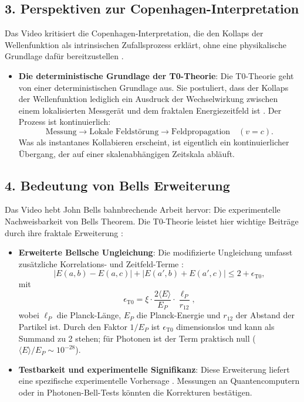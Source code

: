 	\subsection*{3. Perspektiven zur Copenhagen-Interpretation}
	
	Das Video kritisiert die Copenhagen-Interpretation, die den Kollaps der Wellenfunktion als intrinsischen Zufallsprozess erklärt, ohne eine physikalische Grundlage dafür bereitzustellen \cite{VideoBell2024}.
	
	\begin{itemize}
		\item \textbf{Die deterministische Grundlage der T0-Theorie}: Die T0-Theorie geht von einer deterministischen Grundlage aus. Sie postuliert, dass der Kollaps der Wellenfunktion lediglich ein Ausdruck der Wechselwirkung zwischen einem lokalisierten Messgerät und dem fraktalen Energiezeitfeld ist . Der Prozess ist kontinuierlich:
		\[
		\text{Messung} \rightarrow \text{Lokale Feldstörung} \rightarrow \text{Feldpropagation} \quad (v = c).
		\]
		Was als instantanes Kollabieren erscheint, ist eigentlich ein kontinuierlicher Übergang, der auf einer skalenabhängigen Zeitskala abläuft.
	\end{itemize}
	
	\subsection*{4. Bedeutung von Bells Erweiterung}
	
	Das Video hebt John Bells bahnbrechende Arbeit hervor: Die experimentelle Nachweisbarkeit von Bells Theorem. Die T0-Theorie leistet hier wichtige Beiträge durch ihre fraktale Erweiterung \cite{DynMassePhotonenNichtlokalEn, NoGoEn}:
	
	\begin{itemize}
		\item \textbf{Erweiterte Bellsche Ungleichung}: Die modifizierte Ungleichung umfasst zusätzliche Korrelations- und Zeitfeld-Terme \cite{DynMassePhotonenNichtlokalEn}:
		\[
		|E(a,b) - E(a,c)| + |E(a',b) + E(a',c)| \leq 2 + \epsilon_{\mathrm{T0}},
		\]
		mit
		\[
		\epsilon_{\mathrm{T0}} = \xi \cdot \frac{2\langle E \rangle}{E_P} \cdot \frac{\ell_P}{r_{12}},
		\]
		wobei $ \ell_P $ die Planck-Länge, $E_P$ die Planck-Energie und $ r_{12} $ der Abstand der Partikel ist. Durch den Faktor $1/E_P$ ist $\epsilon_{\mathrm{T0}}$ dimensionslos und kann als Summand zu 2 stehen; für Photonen ist der Term praktisch null ($\langle E \rangle/E_P \sim 10^{-28}$).
		
		\item \textbf{Testbarkeit und experimentelle Signifikanz}: Diese Erweiterung liefert eine spezifische experimentelle Vorhersage \cite{023_Bell_En_ch}. Messungen an Quantencomputern oder in Photonen-Bell-Tests könnten die Korrekturen bestätigen.
	\end{itemize}
	
